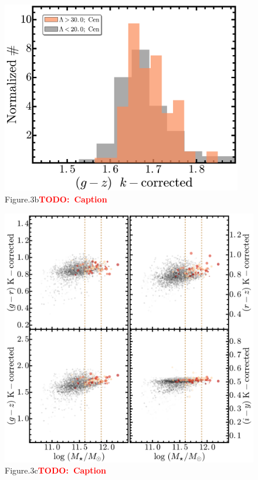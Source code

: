 \documentclass[preprint]{aastex}
\newcommand{\todo}[1]{\textcolor{red}{\textbf{TODO:~#1}}}
\begin{document}
\begin{CJK*}{UTF8}{gbsn}
\begin{figure}
    \centering 
    \includegraphics[width=10.5cm]{fig/dr1_redbcg_isedfit_mass_fsps1_sbpsum_imgsub_use_gzKcor_hist}
    \caption{Figure.3b\todo{Caption}}\label{figure:3b}
\end{figure}

\begin{figure}
    \centering 
    \includegraphics[width=12.5cm]{fig/dr1_redbcg_isedfit_mass_fsps1_sbpsum_imgsub_use_mass_color}
    \caption{Figure.3c\todo{Caption}}\label{figure:3c}
\end{figure}


\end{CJK*}
\end{document}
